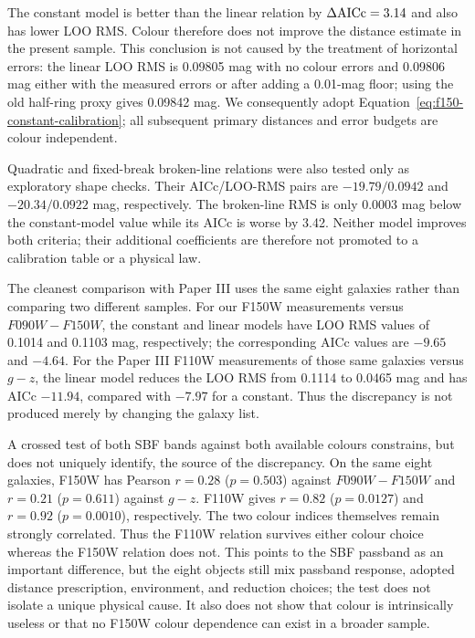 \documentclass[nodoi,nocopyright]{pas}
\begin{document}
The constant model is better than the linear relation by
$\Delta{\rm AICc}=3.14$ and also has lower LOO RMS. Colour therefore does not
improve the distance estimate in the present sample. This conclusion is not
caused by the treatment of horizontal errors: the linear LOO RMS is 0.09805
mag with no colour errors and 0.09806 mag either with the measured errors or
after adding a 0.01-mag floor; using the old half-ring proxy gives 0.09842
mag. We consequently adopt
Equation~\ref{eq:f150-constant-calibration}; all subsequent primary distances and
error budgets are colour independent.

Quadratic and fixed-break broken-line relations were also tested only as
exploratory shape checks. Their AICc/LOO-RMS pairs are $-19.79/0.0942$ and
$-20.34/0.0922$ mag, respectively. The broken-line RMS is only 0.0003 mag
below the constant-model value while its AICc is worse by 3.42. Neither model
improves both criteria; their additional coefficients are therefore not
promoted to a calibration table or a physical law.

The cleanest comparison with Paper III uses the same eight galaxies rather
than comparing two different samples. For our F150W measurements versus
$F090W-F150W$, the constant and linear models have LOO RMS values of 0.1014
and 0.1103 mag, respectively; the corresponding AICc values are $-9.65$ and
$-4.64$. For the Paper III F110W measurements of those same galaxies versus
$g-z$, the linear model reduces the LOO RMS from 0.1114 to 0.0465 mag and has
AICc $-11.94$, compared with $-7.97$ for a constant. Thus the discrepancy is
not produced merely by changing the galaxy list.

A crossed test of both SBF bands against both available colours constrains,
but does not uniquely identify, the source of the discrepancy. On the same
eight galaxies, F150W has Pearson
$r=0.28$ ($p=0.503$) against $F090W-F150W$ and $r=0.21$ ($p=0.611$)
against $g-z$. F110W gives $r=0.82$ ($p=0.0127$) and $r=0.92$
($p=0.0010$), respectively. The two colour indices themselves remain strongly
correlated. Thus the F110W relation survives either colour choice whereas the
F150W relation does not. This points to the SBF passband as an important
difference, but the eight objects still mix passband response, adopted
distance prescription, environment, and reduction choices; the test does not
isolate a unique physical cause. It also does not show that colour is
intrinsically useless or that no F150W colour dependence can exist in a broader
sample.
\end{document}
